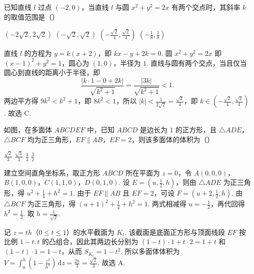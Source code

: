 \begin{problem}
已知直线 \(l\) 过点 \((-2,0)\)，当直线 \(l\) 与圆 \(x^{2}+y^{2}=2x\) 有两个交点时，其斜率 \(k\) 的取值范围是（\quad）

\choices
    {\((-2\sqrt{2}, 2\sqrt{2})\)}
    {\((-\sqrt{2}, \sqrt{2})\)}
    {\(\left(-\frac{\sqrt{2}}{4}, \frac{\sqrt{2}}{4}\right)\)}
    {\(\left(-\frac{1}{8}, \frac{1}{8}\right)\)}

\begin{solution}
直线 \(l\) 的方程为 \(y=k(x+2)\)，即 \(kx-y+2k=0\). 圆 \(x^{2}+y^{2}=2x\) 即 \((x-1)^{2}+y^{2}=1\)，圆心为 \((1,0)\)，半径为 \(1\). 直线与圆有两个交点，当且仅当圆心到直线的距离小于半径，即
\[
\frac{\left|k\cdot1-0+2k\right|}{\sqrt{k^{2}+1}}=\frac{\left|3k\right|}{\sqrt{k^{2}+1}}<1.
\]
两边平方得 \(9k^{2}<k^{2}+1\)，即 \(8k^{2}<1\)，所以 \(\left|k\right|<\frac{1}{2\sqrt{2}}=\frac{\sqrt{2}}{4}\)，即 \(k\in\left(-\frac{\sqrt{2}}{4},\frac{\sqrt{2}}{4}\right)\). 故选 C.
\end{solution}
\end{problem}

\begin{problem}
如图，在多面体 \(ABCDEF\) 中，已知 \(ABCD\) 是边长为 \(1\) 的正方形，且 \(\triangle ADE\)，\(\triangle BCF\) 均为正三角形，\(EF \parallel AB\)，\(EF = 2\)，则该多面体的体积为（\quad）



\choices
    {\(\frac{\sqrt{2}}{3}\)}
    {\(\frac{\sqrt{3}}{3}\)}
    {\(\frac{4}{3}\)}
    {\(\frac{3}{2}\)}

\begin{solution}
建立空间直角坐标系，取正方形 \(ABCD\) 所在平面为 \(z=0\)，令
\(A(0,0,0)\)，\(B(1,0,0)\)，\(C(1,1,0)\)，\(D(0,1,0)\). 设
\(E=(u,\frac12,h)\)，则由 \(\triangle ADE\) 为正三角形，得
\(u^{2}+\frac14+h^{2}=1\). 由于 \(EF\parallel AB\) 且 \(EF=2\)，可设 \(F=(u+2,\frac12,h)\). 由 \(\triangle BCF\) 为正三角形，得
\((u+1)^{2}+\frac14+h^{2}=1\). 两式相减得 \(u=-\frac12\)，再代回得 \(h^{2}=\frac12\). 取 \(h=\frac{1}{\sqrt{2}}\).

记 \(z=th\)（\(0\leqslant t\leqslant1\)）的水平截面为 \(K_t\). 该截面是底面正方形与顶面线段 \(EF\) 按比例 \(1-t:t\) 的凸组合，因此其两边长分别为
\((1-t)\cdot1+t\cdot2=1+t\) 和 \((1-t)\cdot1=1-t\)，从而
\(S_{K_t}=1-t^{2}\). 所以多面体体积为
\(V=\displaystyle\int_{0}^{h}\left(1-\frac{z^{2}}{h^{2}}\right)\,\mathrm dz=\frac{2h}{3}=\frac{\sqrt{2}}{3}\). 故选 A.
\end{solution}
\end{problem}

